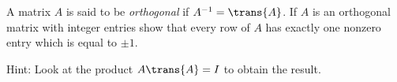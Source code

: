 
\begin{Exercise}[
name={},
title={}, 
difficulty=0,
origin={\cite{BS}}]
A matrix $A$ is said to be \emph{orthogonal} if $A^{-1} = \trans{A}$.
If $A$ is an orthogonal matrix with integer entries show that every row of $A$ has exactly
one nonzero entry which is equal to $\pm1$.
\end{Exercise}

\begin{Answer}
Hint: Look at the product $A\trans{A}=I$ to obtain the result.
\end{Answer}
